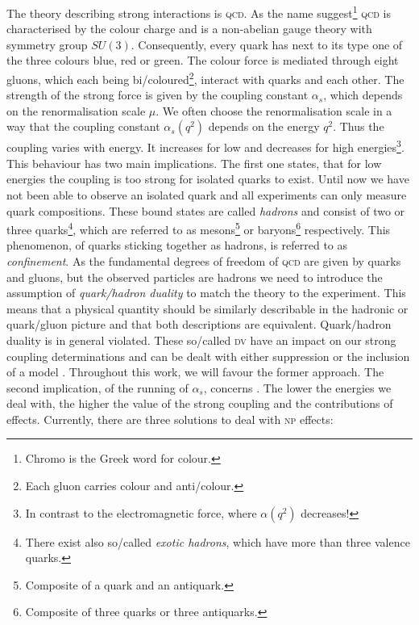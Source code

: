 \documentclass[../../index.tex]{subfiles}
\begin{document}
The theory describing strong interactions is \textsc{qcd}. As the name
suggest\footnote{Chromo is the Greek word for colour.} \textsc{qcd} is
characterised by the colour charge and is a non-abelian gauge theory with
symmetry group \(SU(3)\). Consequently, every quark has next to its type one of
the three colours blue, red or green. The colour force is mediated through eight
gluons, which each being bi\-/coloured\footnote{Each gluon carries colour and
  anti\-/colour.}, interact with quarks and each other. The strength of the
strong force is given by the coupling constant \(\alpha_s\), which depends on
the renormalisation scale \(\mu\). We often choose the renormalisation scale in
a way that the coupling constant \(\alpha_s(q^2)\) depends on the energy
\(q^2\). Thus the coupling varies with energy. It increases for low and
decreases for high energies\footnote{In contrast to the electromagnetic force,
  where \(\alpha(q^2)\) decreases!}. This behaviour has two main implications.
The first one states, that for low energies the coupling is too strong for
isolated quarks to exist. Until now we have not been able to observe an isolated
quark and all experiments can only measure quark compositions. These bound
states are called \textit{hadrons} and consist of two or three
quarks\footnote{There exist also so\-/called \textit{exotic hadrons}, which have
  more than three valence quarks.}, which are referred to as
mesons\footnote{Composite of a quark and an antiquark.} or
baryons\footnote{Composite of three quarks or three antiquarks.} respectively.
This phenomenon, of quarks sticking together as hadrons, is referred to as
\textit{confinement}. As the fundamental degrees of freedom of \textsc{qcd} are
given by quarks and gluons, but the observed particles are hadrons we need to
introduce the assumption of \textit{quark\-/hadron duality} to match the theory
to the experiment. This means that a physical quantity should be similarly
describable in the hadronic or quark\-/gluon picture and that both descriptions
are equivalent. Quark\-/hadron duality is in general violated. These so\-/called
\textsc{dv} have an impact on our strong coupling determinations and can be
dealt with either suppression or the inclusion of a model \cite{Cata2008}.
Throughout this work, we will favour the former approach. The second
implication, of the running of \(\alpha_s\), concerns . The lower the energies we deal with, the higher the value of the
strong coupling and the contributions of 
effects. Currently, there are three solutions to deal with \textsc{np} effects:
\end{document}
